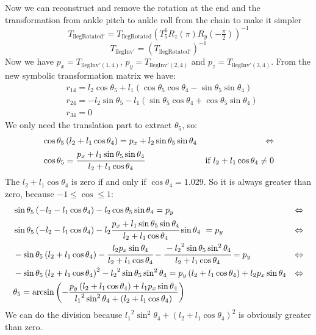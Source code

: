 Now we can reconstruct and remove the rotation at the end and the transformation from ankle pitch to ankle roll from the chain to make it simpler
\[
T_{\text{llegRotated}'} = T_\text{llegRotated}\left(T^6_5R_z\left(\pi\right)R_y(-\tfrac{\pi}{2})\right)^{-1}
\]
\[
T_{\text{llegInv}'} = \left( T_{\text{llegRotated}'} \right) ^{-1}
\]
Now we have $p_x = T_{\text{llegInv}'(1,4)}$, $p_y = T_{\text{llegInv}'(2,4)}$ and $p_z = T_{\text{llegInv}'(3,4)}$. From the new symbolic transformation matrix we have:
\begin{align*}
&r_{14} = l_2\cos\theta_5 + l_1\left(\cos\theta_5\cos\theta_4 - \sin\theta_5\sin\theta_4\right)\\
&r_{24} = -l_2\sin\theta_5 - l_1\left(\sin\theta_5\cos\theta_4 + \cos\theta_5\sin\theta_4\right)\\
&r_{34} = 0
\end{align*}
We only need the translation part to extract $\theta_5$, so:
\begin{align*}
&\cos\theta_5\left(l_2+l_1\cos\theta_4\right) = p_x + l_2\sin\theta_5\sin\theta_4 & \Leftrightarrow\\
&\cos\theta_5 = \cfrac{p_x + l_1\sin\theta_5\sin\theta_4}{l_2+l_1\cos\theta_4}&\text{if }l_2+l_1\cos\theta_4\neq0\\
\end{align*}
The $l_2+l_1\cos\theta_4$ is zero if and only if $\cos\theta_4 = 1.029$. So it is always greater than zero, because $-1 \leq \cos \leq 1$:
\begin{align*}
&\sin\theta_5\left(-l_2-l_1\cos\theta_4\right) - l_2\cos\theta_5\sin\theta_4 = p_y& \Leftrightarrow\\
&\sin\theta_5\left(-l_2-l_1\cos\theta_4\right) - l_2\cfrac{p_x + l_1\sin\theta_5\sin\theta_4}{l_2+l_1\cos\theta_4}\sin\theta_4\ =p_y & \Leftrightarrow\\
&-\sin\theta_5\left(l_2+l_1\cos\theta_4\right) - \cfrac{l_2p_x\sin\theta_4}{l_2+l_1\cos\theta_4} - \cfrac{-{l_2}^2\sin\theta_5\sin^2\theta_4}{l_2+l_1\cos\theta_4} = p_y&\Leftrightarrow\\
&-\sin\theta_5\left(l_2+l_1\cos\theta_4\right)^2 - {l_2}^2\sin\theta_5\sin^2\theta_4 = p_y\left(l_2+l_1\cos\theta_4\right) + l_2p_x\sin\theta_4 & \Leftrightarrow\\
&\theta_5 = \arcsin\left(-\frac{p_y\left(l_2+l_1\cos\theta_4\right) + l_1p_x\sin\theta_4}{{l_1}^2\sin^2\theta_4 + \left(l_2 + l_1\cos\theta_4\right)}\right)
\end{align*}
We can do the division because ${l_1}^2\sin^2\theta_4 + \left(l_2 + l_1\cos\theta_4\right)^2$ is obviously greater than zero. 
